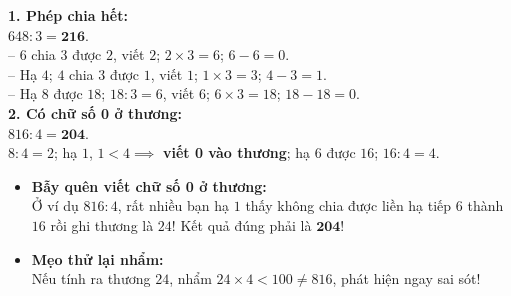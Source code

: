 \documentclass[11pt,a4paper]{article}
\begin{document}
\vspace{-2.5mm}
\noindent
\begin{minipage}[t]{0.49\textwidth}\vspace{0pt}
\begin{tcolorbox}[
  enhanced,
  colback=green!4!white,
  colframe=green!60!black,
  arc=2mm, boxrule=0.8pt,
  left=2mm, right=2mm, top=1.8mm, bottom=1.8mm,
  title={\footnotesize\bfseries\color{white}\faCheckCircle\ Ví dụ thực hành chuẩn mực}
]
{\footnotesize
\textbf{1. Phép chia hết:}\\
$648 : 3 = \mathbf{216}$.\\
-- $6$ chia $3$ được $2$, viết $2$; $2 \times 3 = 6$; $6 - 6 = 0$.\\
-- Hạ $4$; $4$ chia $3$ được $1$, viết $1$; $1 \times 3 = 3$; $4 - 3 = 1$.\\
-- Hạ $8$ được $18$; $18 : 3 = 6$, viết $6$; $6 \times 3 = 18$; $18 - 18 = 0$.\\
\textbf{2. Có chữ số 0 ở thương:}\\
$816 : 4 = \mathbf{204}$.\\
$8 : 4 = 2$; hạ $1$, $1 < 4 \implies$ \textbf{viết 0 vào thương}; hạ $6$ được $16$; $16 : 4 = 4$.
}
\end{tcolorbox}
\end{minipage}
\hfill
\begin{minipage}[t]{0.49\textwidth}\vspace{0pt}
\begin{tcolorbox}[
  enhanced,
  colback=red!4!white,
  colframe=red!70!black,
  arc=2mm, boxrule=0.8pt,
  left=2mm, right=2mm, top=1.8mm, bottom=1.8mm,
  title={\footnotesize\bfseries\color{white}\faExclamationTriangle\ Mẹo tránh bẫy trắc nghiệm}
]
{\footnotesize
\begin{itemize}\setlength{\itemsep}{1.5pt}\setlength{\leftskip}{-2.5mm}
  \item \textbf{Bẫy quên viết chữ số 0 ở thương:}\\
  Ở ví dụ $816 : 4$, rất nhiều bạn hạ $1$ thấy không chia được liền hạ tiếp $6$ thành $16$ rồi ghi thương là $24$! Kết quả đúng phải là $\mathbf{204}$!
  \item \textbf{Mẹo thử lại nhẩm:}\\
  Nếu tính ra thương $24$, nhẩm $24 \times 4 < 100 \ne 816$, phát hiện ngay sai sót!
\end{itemize}
}
\end{tcolorbox}
\end{minipage}
\end{document}
